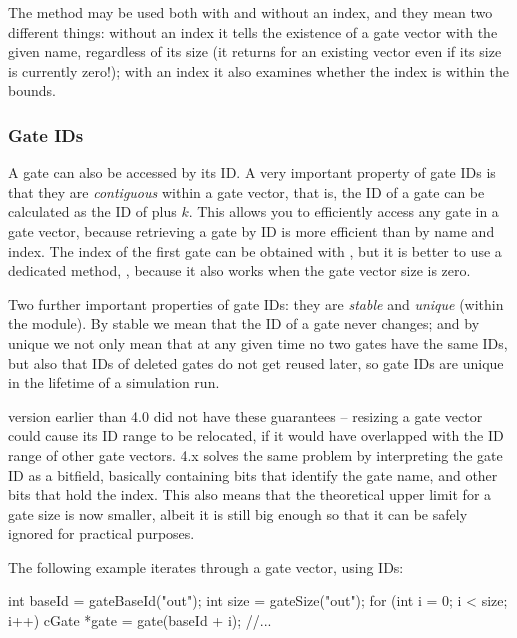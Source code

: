 The  method may be used both with and without an
index, and they mean two different things: without an index it tells
the existence of a gate vector with the given name, regardless of its
size (it returns  for an existing vector even if its size
is currently zero!); with an index it also examines whether the index
is within the bounds.


\subsubsection{Gate IDs}
\label{sec:simple-modules:gate-ids}

A gate can also be accessed by its ID. A very important property of gate IDs
is that they are \textit{contiguous} within a gate vector, that is,
the ID of a gate  can be calculated as the ID of  plus $k$.
This allows you to efficiently access any gate in a gate vector, because
retrieving a gate by ID is more efficient than by name and index.
The index of the first gate can be obtained with ,
but it is better to use a dedicated method, ,
because it also works when the gate vector size is zero.

Two further important properties of gate IDs: they are \textit{stable}
and \textit{unique} (within the module). By stable we mean that the ID
of a gate never changes; and by unique we not only mean that at any
given time no two gates have the same IDs, but also that IDs of deleted
gates do not get reused later, so gate IDs are unique in the lifetime
of a simulation run.

\begin{note}
    {\opp} version earlier than 4.0 did not have these guarantees -- resizing
    a gate vector could cause its ID range to be relocated, if it
    would have overlapped with the ID range of other gate vectors.
    {\opp} 4.x solves the same problem by interpreting the gate ID
    as a bitfield, basically containing bits that identify the gate name,
    and other bits that hold the index. This also means that the theoretical
    upper limit for a gate size is now smaller, albeit it is still
    big enough so that it can be safely ignored for practical purposes.
\end{note}

The following example iterates through a gate vector, using IDs:

\begin{cpp}
int baseId = gateBaseId("out");
int size = gateSize("out");
for (int i = 0; i < size; i++) {
    cGate *gate = gate(baseId + i);
    //...
}
\end{cpp}


